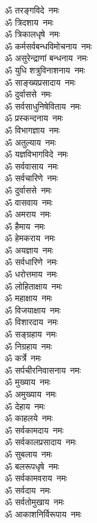\begin{multicols}{2}
\begin{flushleft}
ॐ तरङ्गविदे~नमः\\
ॐ त्रिदशाय~नमः\\
ॐ त्रिकालधृषे~नमः\\
ॐ कर्मसर्वबन्धविमोचनाय~नमः\\
ॐ असुरेन्द्राणां बन्धनाय~नमः\\
ॐ युधि शत्रुविनाशनाय~नमः\\
ॐ साङ्ख्यप्रसादाय~नमः\\
ॐ दुर्वाससे~नमः\hfill{}\\
ॐ सर्वसाधुनिषेविताय~नमः\\
ॐ प्रस्कन्दनाय~नमः\\
ॐ विभागज्ञाय~नमः\\
ॐ अतुल्याय~नमः\\
ॐ यज्ञविभागविदे~नमः\\
ॐ सर्ववासाय~नमः\\
ॐ सर्वचारिणे~नमः\\
ॐ दुर्वाससे~नमः\\
ॐ वासवाय~नमः\\
ॐ अमराय~नमः\hfill{}\\
ॐ हैमाय~नमः\\
ॐ हेमकराय~नमः\\
ॐ अयज्ञाय~नमः\\
ॐ सर्वधारिणे~नमः\\
ॐ धरोत्तमाय~नमः\\
ॐ लोहिताक्षाय~नमः\\
ॐ महाक्षाय~नमः\\
ॐ विजयाक्षाय~नमः\\
ॐ विशारदाय~नमः\\
ॐ सङ्ग्रहाय~नमः\hfill{}\\
ॐ निग्रहाय~नमः\\
ॐ कर्त्रे~नमः\\
ॐ सर्पचीरनिवासनाय~नमः\\
ॐ मुख्याय~नमः\\
ॐ अमुख्याय~नमः\\
ॐ देहाय~नमः\\
ॐ काहलये~नमः\\
ॐ सर्वकामदाय~नमः\\
ॐ सर्वकालप्रसादाय~नमः\\
ॐ सुबलाय~नमः\hfill{}\\
ॐ बलरूपधृषे~नमः\\
ॐ सर्वकामवराय~नमः\\
ॐ सर्वदाय~नमः\\
ॐ सर्वतोमुखाय~नमः\\
ॐ आकाशनिर्विरूपाय~नमः\\

\end{flushleft}
\end{multicols}
